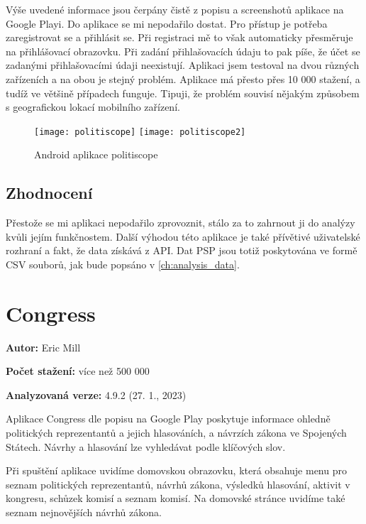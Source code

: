 Výše uvedené informace jsou čerpány čistě z popisu a screenshotů aplikace na Google Playi. Do aplikace se mi nepodařilo dostat. Pro přístup je potřeba zaregistrovat se a přihlásit se. Při registraci mě to však automaticky přesměruje na přihlášovací obrazovku. Při zadání přihlašovacích údaju to pak píše, že účet se zadanými přihlašovacími údaji neexistují. Aplikaci jsem testoval na dvou různých zařízeních a na obou je stejný problém. Aplikace má přesto přes 10 000 stažení, a tudíž ve většině případech funguje. Tipuji, že problém souvisí nějakým způsobem s geografickou lokací mobilního zařízení.

\begin{figure}
	\centering

	\texttt{[image: politiscope]}
	\texttt{[image: politiscope2]}
	
	\caption{Android aplikace politiscope}
	\label{fig:politoscope}
\end{figure}

\subsection{Zhodnocení}
Přestože se mi  aplikaci nepodařilo zprovoznit, stálo za to zahrnout ji do analýzy kvůli jejím funkčnostem. Další výhodou této aplikace je také přívětivé uživatelské rozhraní a fakt, že data získává z API. Dat PSP jsou totiž poskytována ve formě CSV souborů, jak bude popsáno v \ref{ch:analysis_data}.

\section{Congress}

\begin{description}
	\item \textbf{Autor:} Eric Mill
	\item \textbf{Počet stažení:} více než 500 000
	\item \textbf{Analyzovaná verze:} 4.9.2 (27. 1., 2023)
\end{description}

Aplikace Congress \cite{congress} dle popisu na Google Play poskytuje informace ohledně politických reprezentantů a jejich hlasováních, a návrzích zákona ve Spojených Státech. Návrhy a hlasování lze vyhledávat podle klíčových slov.

Při spuštění aplikace uvidíme domovskou obrazovku, která obsahuje menu pro seznam politických reprezentantů, návrhů zákona, výsledků hlasování, aktivit v kongresu, schůzek komisí a seznam komisí. Na domovské stránce uvidíme také seznam nejnovějších návrhů zákona. 

